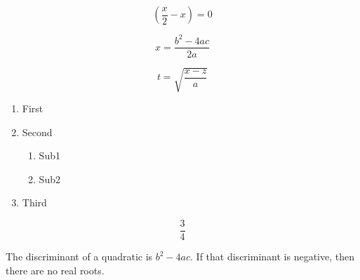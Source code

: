 \documentclass{article}
\begin{document}
$$\left( \frac{x}{2} - x \right) = 0$$

$$x = \frac{b^2-4ac}{2a}$$

$$t = \sqrt{\frac{x-z}{a}}$$


\begin{enumerate}
\item First
\item Second
	\begin{enumerate}
	\item Sub1
	\item Sub2
	\end{enumerate}
\item Third
\end{enumerate}

$$\frac{3}{4}$$

The discriminant of a quadratic is $b^2 - 4ac$.  If that discriminant
is negative, then there are no real roots.
\end{document}
